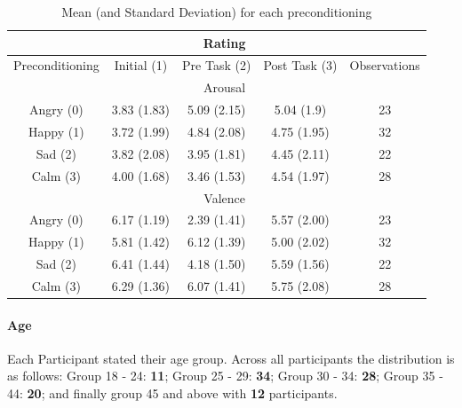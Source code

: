 	\begin{table}[h!]
	\begin{center}
				
		\begin{tabular}{|c|c|c|c|c|}
			\hline 
			& \multicolumn{3}{c|}{Rating} &  \\ 
			\hline 
			Preconditioning & Initial (1) & Pre Task (2) & Post Task (3) & Observations \\ 
			\hline 
			& \multicolumn{3}{|c|}{Arousal} &  \\ 
			\hline 
			Angry (0) & 3.83 (1.83) & 5.09 (2.15) & 5.04 (1.9) & 23 \\ 
			\hline 
			Happy (1) & 3.72 (1.99) & 4.84 (2.08) & 4.75 (1.95) & 32 \\ 
			\hline 
			Sad (2) & 3.82 (2.08) & 3.95 (1.81) & 4.45 (2.11) & 22 \\ 
			\hline 
			Calm (3) & 4.00 (1.68) & 3.46 (1.53) & 4.54 (1.97) & 28 \\ 
			\hline 
			& \multicolumn{3}{|c|}{Valence} &  \\ 
			\hline 
			Angry (0) & 6.17 (1.19) & 2.39 (1.41) & 5.57 (2.00) & 23 \\ 
			\hline 
			Happy (1) & 5.81 (1.42) & 6.12 (1.39) & 5.00 (2.02) & 32 \\ 
			\hline 
			Sad (2) & 6.41 (1.44) & 4.18 (1.50) & 5.59 (1.56) & 22 \\ 
			\hline 
			Calm (3) & 6.29 (1.36) & 6.07 (1.41) & 5.75 (2.08) & 28 \\ 
			\hline 
		\end{tabular}
	\end{center}
	\caption{Mean (and Standard Deviation) for each preconditioning}
	\label{tbl:distributionOfAffect}
	\end{table}

	\paragraph{Age}
	
	Each Participant stated their age group. Across all participants the distribution is as follows: Group 18 - 24: \textbf{11};
	Group 25 - 29: \textbf{34}; Group 30 - 34: \textbf{28}; Group 35 - 44: \textbf{20}; and finally group 45 and above with \textbf{12} participants.	

	
